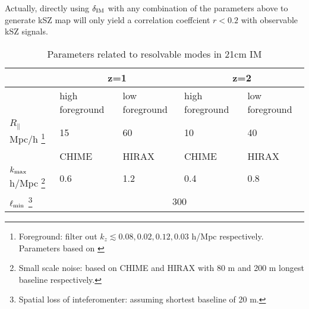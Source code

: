 Actually, directly using $\delta_\mathrm{IM}$ with any combination of the parameters above to generate kSZ map will only yield a correlation coeffcient $r<0.2$ with observable kSZ signals. 
\begin{table}
\begin{tabular}{|m{2cm}|m{1.5cm}|m{1.5cm}|m{1.5cm}|m{1.5cm}|}
    \hline
     & \multicolumn{2}{|c|}{z=1} &\multicolumn{2}{|c|}{z=2}\\
     \hline
     & high foreground &low foreground&high foreground& low foreground\\
     \cline{2-5}
     $R_\parallel$ Mpc/h
     \footnote{Foreground: filter out $k_z\lesssim 0.08,0.02,0.12,0.03$ h/Mpc respectively. Parameters based on \cite{2013ApJ...763L..20M,Switzer13,15Shaw}}
      & 15 & 60 & 10 & 40 \\
     \hline
     & CHIME & HIRAX & CHIME &HIRAX\\
     \cline{2-5}
     $k_\mathrm{max}$ h/Mpc 
     \footnote{Small scale noise: based on CHIME\cite{2014CHIME} and HIRAX\cite{HIRAX} 
     with 80 m and 200 m longest baseline respectively.}
     & 0.6 & 1.2 & 0.4 & 0.8 \\
     \hline
     $\ell_\mathrm{min}$
     \footnote{Spatial loss of inteferomenter: assuming shortest baseline of 20 m.}
     & \multicolumn{4}{|c|}{300} \\
     \hline
\end{tabular}
     \caption{Parameters related to resolvable modes in 21cm IM}
     \label{tab:para}
\end{table}
